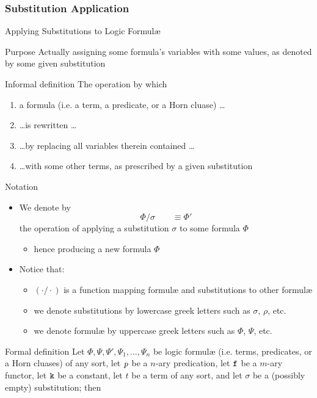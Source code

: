 \documentclass[presentation]{beamer}\mode<presentation>{\usetheme{AMSBolognaFC}}
\begin{document}
\subsubsection{Substitution Application}

\begin{frame}[allowframebreaks]{Applying Substitutions to Logic Formul\ae{}}
    \begin{block}{Purpose}\centering
        Actually assigning some formula's variables with some values, as denoted by some given substitution
    \end{block}
    \begin{block}{Informal definition}
        The operation by which 
        \begin{enumerate}
            \item a formula (i.e. a term, a predicate, or a Horn cluase) \ldots
            \item \ldots is \alert{rewritten} \ldots
            \item \ldots by \alert{replacing} all variables therein contained \ldots
            \item \ldots with some other \alert{terms}, as prescribed by a given \alert{substitution}
        \end{enumerate}
    \end{block}
    \begin{block}{Notation}
        \begin{itemize}
            \item We denote by 
            \[ \Phi / \sigma \qquad \equiv \Phi'\]
            the operation of applying a substitution $\sigma$ to some formula $\Phi$
            \begin{itemize}
                \item hence producing a new formula $\Phi$
            \end{itemize}

            \item Notice that:
            \begin{itemize}
                \item $(\cdot / \cdot)$ is a function mapping formul\ae{} and substitutions to other formul\ae{}
                \item we denote substitutions by lowercase greek letters such as $\sigma$, $\rho$, etc.
                \item we denote formul\ae{} by uppercase greek letters such as $\Phi$, $\Psi$, etc.
            \end{itemize} 
        \end{itemize}
    \end{block}
    \begin{alertblock}{Formal definition}
        Let $\Phi, \Psi, \Psi', \Psi_1, \ldots, \Psi_n$ be logic formul\ae{} (i.e. terms, predicates, or a Horn cluases) of any sort, 
        let $\text{\textit{p}}$ be a $n$-ary predication, let $\mathtt{f}$ be a $m$-ary functor, let $\mathtt{k}$ be a constant, let $t$ be a term of any sort,
        and let $\sigma$ be a (possibly empty) substitution;
        then
        

\end{alertblock}
\end{frame}
\end{document}
